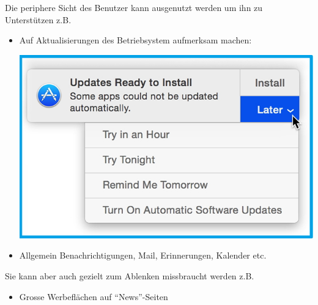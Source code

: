 \graphicspath{ {../images/} } 

Die periphere Sicht des Benutzer kann ausgenutzt werden um ihn zu Unterstützen
z.B. 
\begin{itemize}
  \item Auf Aktualisierungen des Betriebsystem aufmerksam machen:\par
    \begin{minipage}{\linewidth}
      \centering
      \includegraphics{updates_available}
    \end{minipage}
  \item Allgemein Benachrichtigungen, Mail, Erinnerungen, Kalender etc.

\end{itemize}

Sie kann aber auch gezielt zum Ablenken missbraucht werden z.B.
\begin{itemize}
  \item Grosse Werbeflächen auf "`News"'-Seiten
\end{itemize}
